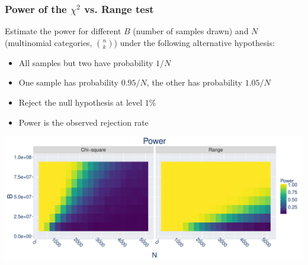 \documentclass{beamer}
\begin{document}
\begin{frame}\label{range_power}
\frametitle{Power of the $\chi^2$ vs. Range test}

Estimate the power for different $B$ (number of samples drawn) and $N$ (multinomial categories, $n \choose k$) under the following alternative hypothesis:
\begin{itemize}
\item All samples but two have probability $1/N$
\item One sample has probability $0.95/N$, the other has probability $1.05/N$
\item Reject the null hypothesis at level $1\%$
\item Power is the observed rejection rate
\end{itemize}

\hyperlink{range_test}{}


\includegraphics[width = \textwidth]{fig/powerplot.pdf}



\end{frame}
\end{document}
